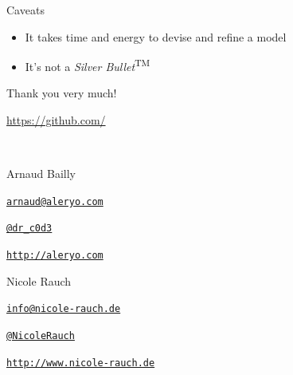 \begin{frame}[fragile]{Caveats}
  \begin{itemize}
  \item It takes time and energy to devise and refine a model
  \item It's not a \emph{Silver Bullet}\textsuperscript{\tiny TM}
  \end{itemize}
\end{frame}


\begin{frame}{Thank you very much!}

  \url{https://github.com/}

  ~\\[1em]
  \begin{block}{Arnaud Bailly}
        \begin{description}[Twitterxx]
        \item[E-Mail]  \href{mailto:arnaud@aleryo.com}{\texttt{arnaud@aleryo.com}}
        \item[Twitter] \href{http://twitter.com/NicoleRauch}{\texttt{@dr\_c0d3}}
        \item[Web] \href{http://aleryo.com}{\texttt{http://aleryo.com}}
        \end{description}
  \end{block}
  \begin{block}{Nicole Rauch}
    \begin{description}[Twitterxx]
    \item[E-Mail]  \href{mailto:info@nicole-rauch.de}{\texttt{info@nicole-rauch.de}}
    \item[Twitter] \href{http://twitter.com/NicoleRauch}{\texttt{@NicoleRauch}}
    \item[Web] \href{http://www.nicole-rauch.de}{\texttt{http://www.nicole-rauch.de}}
    \end{description}
  \end{block}
\end{frame}

